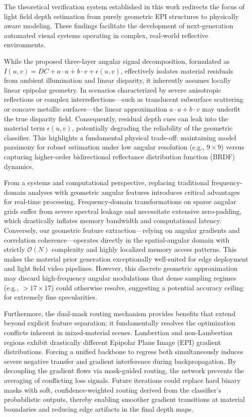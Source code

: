 The theoretical verification system established in this work redirects the focus of light field depth estimation from purely geometric EPI structures to physically aware modeling. These findings facilitate the development of next-generation automated visual systems operating in complex, real-world reflective environments.


While the proposed three-layer angular signal decomposition, formulated as $I(u,v) = DC + a\cdot u + b\cdot v + \epsilon(u,v)$, effectively isolates material residuals from ambient illumination and linear disparity, it inherently assumes locally linear epipolar geometry. In scenarios characterized by severe anisotropic reflections or complex interreflections—such as translucent subsurface scattering or concave metallic surfaces—the linear approximation $a\cdot u + b\cdot v$ may underfit the true disparity field. Consequently, residual depth cues can leak into the material term $\epsilon(u,v)$, potentially degrading the reliability of the geometric classifier. This highlights a fundamental physical trade-off: maintaining model parsimony for robust estimation under low angular resolution (e.g., $9 \times 9$) versus capturing higher-order bidirectional reflectance distribution function (BRDF) dynamics.

From a systems and computational perspective, replacing traditional frequency-domain analyses with geometric angular features introduces critical advantages for real-time processing. Frequency-domain transformations on sparse angular grids suffer from severe spectral leakage and necessitate extensive zero-padding, which drastically inflates memory bandwidth and computational latency. Conversely, our geometric feature extraction—relying on angular gradients and correlation coherence—operates directly in the spatial-angular domain with strictly $\mathcal{O}(N)$ complexity and highly localized memory access patterns. This makes the material prior generation exceptionally well-suited for edge deployment and light field video pipelines. However, this discrete geometric approximation may discard high-frequency angular modulations that dense sampling regimes (e.g., $>17 \times 17$) could otherwise resolve, suggesting a potential accuracy ceiling for extremely fine specularities.

Furthermore, the dual-mask routing mechanism provides benefits that extend beyond explicit feature separation; it fundamentally resolves the optimization conflicts inherent in mixed-material scenes. Lambertian and non-Lambertian regions exhibit drastically different Epipolar Plane Image (EPI) gradient distributions. Forcing a unified backbone to regress both simultaneously induces severe negative transfer and gradient interference during backpropagation. By decoupling the gradient flows via mask-guided routing, the network prevents the averaging of conflicting loss signals. Future iterations could replace hard binary masks with soft, confidence-weighted routing derived from the classifier's probabilistic outputs, thereby enabling smoother gradient transitions at material boundaries and reducing edge artifacts in the final depth maps.

